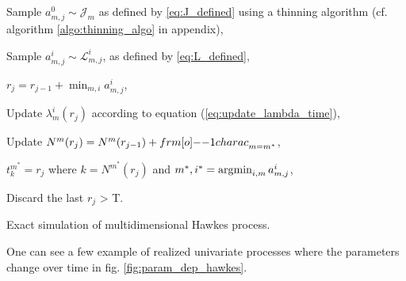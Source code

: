 \documentclass[11pt]{book}
\begin{document}
\begin{algorithm}[H]
\label{algo:simul_hp_time}
\SetAlgoLined

			{ 
					{
						{Sample $a_{m,j}^0 \sim \mathcal J_{m} $ as defined by \ref{eq:J_defined} using a thinning algorithm (cf. algorithm \ref{algo:thinning_algo} in appendix),
						
							{Sample $a_{m,j}^i \sim  \mathcal L^i_{m,j} $, as defined by \ref{eq:L_defined},
							}
						}
						
						$r_j = r_{j-1} + \min_{m,i} a_{m,j}^i$,
						
							{Update $\lambda_m^i ( r_j )$ according to equation (\ref{eq:update_lambda_time}),
							
							Update $N^m ( r_j ) = N^m( r_{j-1} ) + {\11charac}_{m = m^*} $,}
					$t_k^{m^*} = r_j$ where $k = N^{m^*} ( r_j ) $ and $ m^*,i^* = \operatorname*{\arg\!\min}_{i,m} a_{m,j}^i $,
					}
			Discard the last $r_j$ > T.
			}
\caption{Exact simulation of multidimensional Hawkes process.}
\end{algorithm}


\vspace{0.5cm}

One can see a few example of realized univariate processes where the parameters change over time in fig. \ref{fig:param_dep_hawkes}. 
\end{document}
